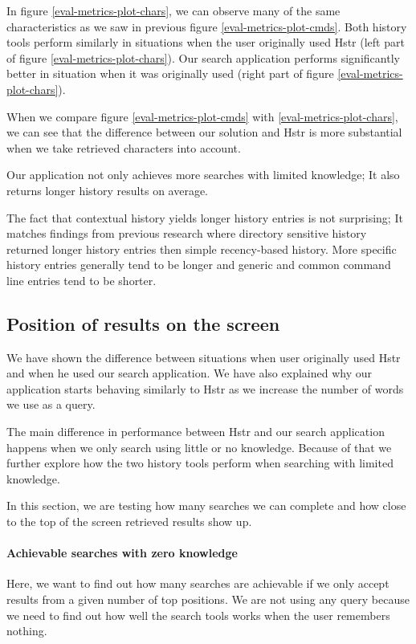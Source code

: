 In figure \ref{eval-metrics-plot-chars}, we can observe many of the same characteristics as we saw in previous figure \ref{eval-metrics-plot-cmds}. Both history tools perform similarly in situations when the user originally used Hstr (left part of figure \ref{eval-metrics-plot-chars}). Our search application performs significantly better in situation when it was originally used (right part of figure \ref{eval-metrics-plot-chars}). 

When we compare figure \ref{eval-metrics-plot-cmds} with \ref{eval-metrics-plot-chars}, we can see that the difference between our solution and  Hstr is more substantial when we take retrieved characters into account. 

Our application not only achieves more searches with limited knowledge; It also returns longer history results on average.

The fact that contextual history yields longer history entries is not surprising; It matches findings from previous research\cite{greenberg1993computer} where directory sensitive history returned longer history entries then simple recency-based history. More specific history entries generally tend to be longer and generic and common command line entries tend to be shorter. 


\subsection{Position of results on the screen}

We have shown the difference between situations when user originally used Hstr and when he used our search application. We have also explained why our application starts behaving similarly to Hstr as we increase the number of words we use as a query.

The main difference in performance between Hstr and our search application happens when we only search using little or no knowledge. Because of that we further explore how the two history tools perform when searching with limited knowledge.

In this section, we are testing how many searches we can complete and how close to the top of the screen retrieved results show up. 

\paragraph{Achievable searches with zero knowledge}

Here, we want to find out how many searches are achievable if we only accept results from a given number of top positions. We are not using any query because we need to find out how well the search tools works when the user remembers nothing.

